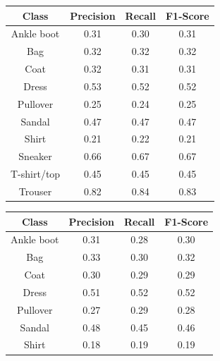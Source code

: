 \begin{table}[H]
    \centering
    \begin{minipage}{0.32\textwidth}
        \centering
        \begin{adjustbox}{max width=1\textwidth}
            \begin{tabular}{|c|c|c|c|}
                \hline
                \textbf{Class} & \textbf{Precision} & \textbf{Recall} & \textbf{F1-Score} \\ \hline
                Ankle boot & 0.31 & 0.30 & 0.31 \\ 
                Bag & 0.32 & 0.32 & 0.32 \\ 
                Coat & 0.32 & 0.31 & 0.31 \\ 
                Dress & 0.53 & 0.52 & 0.52 \\ 
                Pullover & 0.25 & 0.24 & 0.25 \\ 
                Sandal & 0.47 & 0.47 & 0.47 \\ 
                Shirt & 0.21 & 0.22 & 0.21 \\ 
                Sneaker & 0.66 & 0.67 & 0.67 \\ 
                T-shirt/top & 0.45 & 0.45 & 0.45 \\ 
                Trouser & 0.82 & 0.84 & 0.83 \\ \hline
            \end{tabular}
        \end{adjustbox}
    \end{minipage}
    \hfill
    \begin{minipage}{0.32\textwidth}
        \centering
        \begin{adjustbox}{max width=1\textwidth}
            \begin{tabular}{|c|c|c|c|}
            \hline
            \textbf{Class} & \textbf{Precision} & \textbf{Recall} & \textbf{F1-Score} \\ \hline
            Ankle boot & 0.31 & 0.28 & 0.30 \\ 
            Bag & 0.33 & 0.30 & 0.32 \\ 
            Coat & 0.30 & 0.29 & 0.29 \\ 
            Dress & 0.51 & 0.52 & 0.52 \\ 
            Pullover & 0.27 & 0.29 & 0.28 \\ 
            Sandal & 0.48 & 0.45 & 0.46 \\ 
            Shirt & 0.18 & 0.19 & 0.19 \\ 

\end{tabular}
\end{adjustbox}
\end{minipage}
\end{table}
